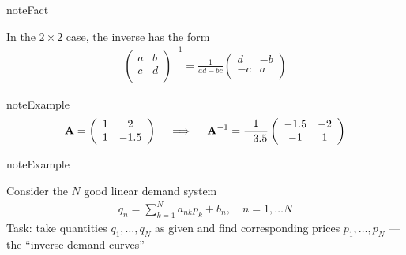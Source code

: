 \documentclass[letterpaper,10pt,english]{jupyterBook}
\begin{document}
\begin{sphinxadmonition}{note}{Fact}

\sphinxAtStartPar
In the \(2 \times 2\) case, the inverse has the form
\begin{equation*}
\begin{split}
%
\left(
\begin{array}{cc}
a & b \\
c & d \\
\end{array}
\right)^{-1} = 
\frac{1}{ad - bc}
\left(
\begin{array}{cc}
d & -b \\
-c & a \\
\end{array}
\right)
%
\end{split}
\end{equation*}\end{sphinxadmonition}

\begin{sphinxadmonition}{note}{Example}
\begin{equation*}
\begin{split}
%
{\bf A} = 
\left(
\begin{array}{cc}
1 & 2 \\
1 & -1.5 \\
\end{array}
\right)
\quad \implies \quad
{\bf A}^{-1} = 
\frac{1}{-3.5}
\left(
\begin{array}{cc}
-1.5 & -2 \\
-1 & 1 \\
\end{array}
\right)
%
\end{split}
\end{equation*}\end{sphinxadmonition}

\begin{sphinxadmonition}{note}{Example}

\sphinxAtStartPar
Consider the \(N\) good linear demand system
\begin{equation}\label{equation:05.linear_algebra:eq:ds}
\begin{split}
%
q_n = \sum_{k=1}^N a_{nk} p_k + b_n,
\quad n = 1, \ldots N
%
\end{split}
\end{equation}
\sphinxAtStartPar
Task: take quantities \(q_1, \ldots, q_N\) as given and find
corresponding prices \(p_1, \ldots, p_N\) — the “inverse demand curves”
\end{sphinxadmonition}
\end{document}
